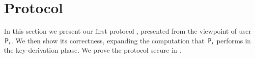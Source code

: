 \section{Protocol}\label{sec:protocol}
In this section we present our first protocol , presented from the viewpoint of user $\User[i]$.
We then show its correctness, expanding the computation that $\User[i]$ performs in the key-derivation phase.
We prove the protocol secure  in .


%
